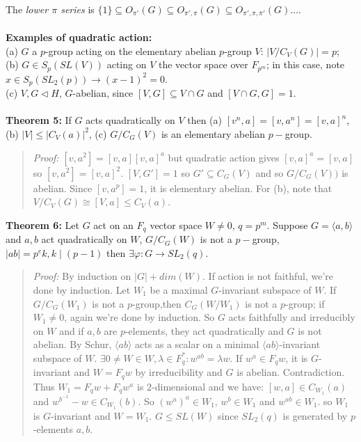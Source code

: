The \emph{lower $\pi$ series} is
$\{ 1 \} \subseteq O_{\pi'}(G) \subseteq O_{\pi', \pi}(G) \subseteq O_{\pi', \pi, \pi'}(G) \ldots$.
\\
\\
{\bf Examples of quadratic action:} \\
(a) $G$ a $p$-group acting on the elementary abelian $p$-group $V$: $|V/C_V(G)|= p$;\\
(b) $G \in S_p(SL(V))$ acting on $V$ the vector space over $F_{p^m}$; in this case, note $x \in S_p(SL_2(p)) \rightarrow (x-1)^2 = 0$.\\
(c) $V, G \lhd H$, $G$-abelian, since $[V,G] \subseteq V \cap G$ and $[V \cap G, G] = 1$.
\\
\\
{\bf Theorem 5:}
If $G$ acts quadratically on $V$ then (a) $[v^n,a]=[v,a^n]=[v,a]^n$,
(b) $|V| \le |C_V(a)|^2$, (c) $G/C_G(V)$ is an elementary abelian $p-$group.
\begin{quote}
\emph{Proof:}  
$[v,a^2]= [v,a] [v,a]^a$ but quadratic action gives $[v,a]^a= [v,a]$ so
$[v,a^2]= [v,a]^2$.  $[V,G']= 1$ so $G' \subseteq C_G(V)$ and so $G/C_G(V))$ is abelian.
Since $[v, a^p] = 1$, it is elementary abelian.  For (b), note that
$V/C_V(G) \cong [V, a] \le C_V(a)$.
\end{quote}
{\bf Theorem 6:}
Let $G$ act on an $F_q$ vector space $W \ne 0$, $q=p^m$.  Suppose $G= \langle a,b \rangle $ and
$a, b$ act quadratically on $W$, $G/C_G(W)$ is not a $p-$group, $|ab|=p^ek, k \mid (p-1)$
then $\exists \varphi: G \rightarrow SL_2(q)$.  
\begin{quote}
\emph{Proof:}  
By induction on $|G|+ dim(W)$.  If action is not faithful, we're done by induction.
Let $W_1$ be a maximal $G$-invariant subspace of $W$.  If $G/C_G(W_1)$ is not a
$p$-group,then $C_G(W/W_1)$ is not a $p$-group; if $W_1 \ne 0$, again we're done by induction.
So $G$ acts faithfully and irreducibly on $W$ and if $a, b$ 
are $p$-elements, they act quadratically and $G$ is not abelian.
By Schur, $\langle ab \rangle $ acts as a scalar on a minimal 
$ \langle ab \rangle $-invariant subspace
of $W$.  $\exists 0 \ne W \in W, \lambda \in F_q^*: w^{ab}= \lambda w$.
If $w^a \in F_q w$, it is $G$-invariant and $W= F_qw$ by irreducibility and $G$ is
abelian.  Contradiction.  Thus $W_1 = F_q w + F_q w^a$ is $2$-dimensional and we
have:
$[w,a] \in C_{W_1}(a)$ and
$w^{b^{-1}} -w \in C_{W_1}(b)$.  So $(w^a)^a \in W_1$, $w^b \in W_1$ and $w^{ab} \in W_1$.
so $W_1$  is $G$-invariant and $W= W_1$.  $G \le SL(W)$ since $SL_2(q)$ is generated by
$p$-elements $a, b$.
\end{quote}
